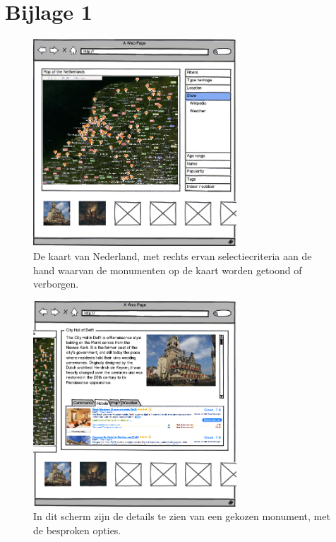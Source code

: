 \documentclass{article}
\begin{document}
\section*{Bijlage 1}
\begin{figure}[h!]
	\centering
	\includegraphics[width=3in]{user-story-overview.png}
	\caption[Het overzichtsscherm]%
	{De kaart van Nederland, met rechts ervan selectiecriteria aan de hand waarvan de monumenten op de kaart worden getoond of verborgen.}
\end{figure}
\begin{figure}[h!]
	\centering
	\includegraphics[width=3in]{user-story-detail.png}
	\caption[Voorbeeld van een detailpagina van een monument]%
	{In dit scherm zijn de details te zien van een gekozen monument, met de besproken opties.}
\end{figure}
\end{document}
